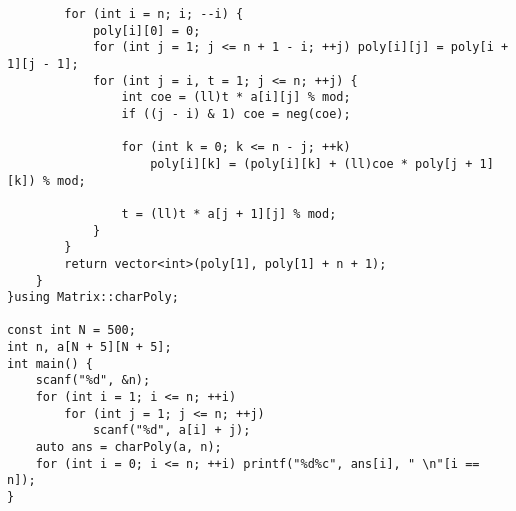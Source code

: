 \begin{verbatim}
        for (int i = n; i; --i) {
            poly[i][0] = 0;
            for (int j = 1; j <= n + 1 - i; ++j) poly[i][j] = poly[i + 1][j - 1];
            for (int j = i, t = 1; j <= n; ++j) {
                int coe = (ll)t * a[i][j] % mod;
                if ((j - i) & 1) coe = neg(coe);
    
                for (int k = 0; k <= n - j; ++k)
                    poly[i][k] = (poly[i][k] + (ll)coe * poly[j + 1][k]) % mod;
    
                t = (ll)t * a[j + 1][j] % mod;
            }
        }
        return vector<int>(poly[1], poly[1] + n + 1);
    }
}using Matrix::charPoly;

const int N = 500;
int n, a[N + 5][N + 5];
int main() {
    scanf("%d", &n);
    for (int i = 1; i <= n; ++i)
        for (int j = 1; j <= n; ++j)
            scanf("%d", a[i] + j);
    auto ans = charPoly(a, n);
    for (int i = 0; i <= n; ++i) printf("%d%c", ans[i], " \n"[i == n]);
}
\end{verbatim}